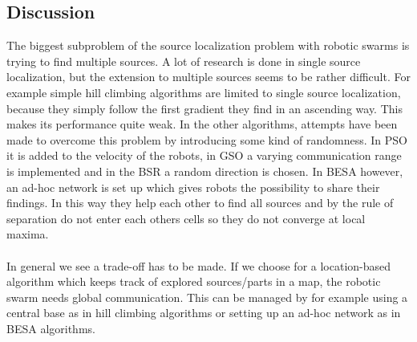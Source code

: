 	\subsection{Discussion}
	\begin{table}[H]
  \renewcommand{\arraystretch}{1.3}
  \label{table_alg_localization}
  \centering
{}
  \caption{Overview of Common Source Localization Algorithms}
  \end{table}
  	The biggest subproblem of the source localization problem with robotic swarms is trying to find multiple sources. 
	A lot of research is done in single source localization, but the extension to multiple sources seems to be rather difficult. 
	For example simple hill climbing algorithms are limited to single source localization, because they simply follow the first gradient they find in an ascending way.
	This makes its performance quite weak. 
	In the other algorithms, attempts have been made to overcome this problem by introducing some kind of randomness. 
	In PSO it is added to the velocity of the robots, in GSO a varying communication range is implemented and in the BSR a random direction is chosen. 
	In BESA however, an ad-hoc network is set up which gives robots the possibility to share their findings. 
	In this way they help each other to find all sources and by the rule of separation do not enter each others cells so they do not converge at local maxima. \\
	\\
	In general we see a trade-off has to be made. 
	If we choose for a location-based algorithm which keeps track of explored sources/parts in a map, the robotic swarm needs global communication. 
	This can be managed by for example using a central base as in hill climbing algorithms or setting up an ad-hoc network as in BESA algorithms. 
